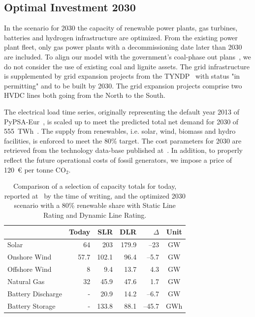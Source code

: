 \documentclass[preprint,12pt]{elsarticle}
\begin{document}
\subsection{Optimal Investment 2030}\label{sec:2030}

In the scenario for 2030 the capacity of renewable power plants, gas turbines, batteries and hydrogen infrastructure are optimized. From the existing power plant fleet, only gas power plants with a decommissioning date later than 2030 are included. To align our model with the government's coal-phase out plans~\cite{federalministryofeconomicaffairsandclimateactionGermanyCurrentClimate2022}, we do not consider the use of existing coal and lignite assets. The grid infrastructure is supplemented by grid expansion projects from the TYNDP~\cite{entsoeTYNDP2018Project2018} with status "in permitting" and to be built by 2030.
The grid expansion projects comprise two HVDC lines both going from the North to the South.

The electrical load time series, originally representing the default year 2013 of PyPSA-Eur~\cite{horschjonasPyPSAEurOpenOptimisation2022}, is scaled up to meet the predicted total net demand for 2030 of 555~TWh~\cite{kemmlerEntwicklungBruttostromverbrauchsBis2021}. The supply from renewables, i.e. solar, wind, biomass and hydro facilities, is enforced to meet the 80\% target.
The cost parameters for 2030 are retrieved from the technology data-base published at~\cite{lisazeyenPyPSATechnologydataTechnology2022}. In addition, to properly reflect the future operational costs of fossil generators, we impose a price of 120~\euro{} per tonne CO$_2$.

\begin{table}[h]
    \caption{Comparison of a selection of capacity totals for today, reported at~\cite{burgerInstalledPowerEnergyCharts} by the time of writing, and the optimized 2030 scenario with a 80\% renewable share with Static Line Rating and Dynamic Line Rating. }
    \centering
    \begin{tabular}{lrrrrc}
        & Today & SLR & DLR & $\Delta$ & Unit \\
        \hline
       Solar & 64 & 203 & 179.9 & --23 & GW \\
       Onshore Wind & 57.7 & 102.1 & 96.4 & --5.7 & GW \\
       Offshore Wind & 8 & 9.4 & 13.7 & 4.3 & GW \\
       Natural Gas & 32 & 45.9 & 47.6 & 1.7 & GW \\
       Battery Discharge & - & 20.9 & 14.2 & --6.7 & GW \\
       Battery Storage & - & 133.8 & 88.1 & --45.7 & GWh \\
       \hline
    \end{tabular}
    \label{tab:installed capacity}
\end{table}
\end{document}
